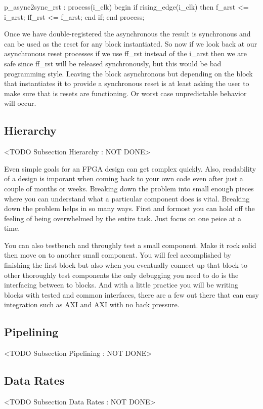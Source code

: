 \begin{VHDLlisting}[tabsize=8]
p_async2sync_rst : process(i_clk)
begin
	if rising_edge(i_clk) then
		f_arst <= i_arst;
		ff_rst <= f_arst;
	end if;
end process;
\end{VHDLlisting}
		
Once we have double-registered the asynchronous the result is synchronous and can be used as the reset for any block instantiated. So now if we look back at our asynchronous reset processes if we use ff\_rst instead of the i\_arst then we are safe since ff\_rst will be released synchronously, but this would be bad programming style. Leaving the block asynchronous but depending on the block that instantiates it to provide a synchronous reset is at least asking the user to make sure that is resets are functioning. Or worst case unpredictable behavior will occur. 
		
		
\subsection{Hierarchy} 
	<TODO Subsection Hierarchy : NOT DONE>

Even simple goals for an \ac{FPGA} design can get complex quickly. Also, readability of a design is imporant when coming back to your own code even after just a couple of months or weeks. Breaking down the problem into small enough pieces where you can understand what a particular component does is vital. Breaking down the problem helps in so many ways. First and formost you can hold off the feeling of being overwhelmed by the entire task. Just focus on one peice at a time. 

You can also testbench and throughly test a small component. Make it rock solid then move on to another small component. You will feel accomplished by finishing the first block but also when you eventually connect up that block to other thoroughly test components the only debugging you need to do is the interfacing between to blocks. And with a little practice you will be writing blocks with tested and common interfaces, there are a few out there that can easy integration such as \ac{AXI} and \ac{AXI} with no back pressure. 
	
\subsection{Pipelining}
	<TODO Subsection Pipelining : NOT DONE>

\subsection{Data Rates}
	<TODO Subsection Data Rates : NOT DONE>


